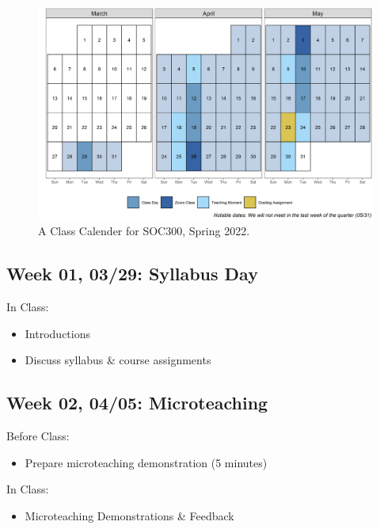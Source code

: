 \documentclass[11pt,]{article}
\providecommand{\tightlist}{%
  \setlength{\itemsep}{0pt}\setlength{\parskip}{0pt}}
\begin{document}
\begin{figure}[H]
  \includegraphics[width=0.95\columnwidth]{figs/calendar.png}
  \caption{A Class Calender for SOC300, Spring 2022.}
\end{figure}

\hypertarget{week-01-0329-syllabus-day}{%
\subsection{Week 01, 03/29: Syllabus
Day}\label{week-01-0329-syllabus-day}}

In Class:

\begin{itemize}
\tightlist
\item
  Introductions
\item
  Discuss syllabus \& course assignments
\end{itemize}

\hypertarget{week-02-0405-microteaching}{%
\subsection{Week 02, 04/05:
Microteaching}\label{week-02-0405-microteaching}}

Before Class:

\begin{itemize}
\tightlist
\item
  Prepare microteaching demonstration (5 minutes)
\end{itemize}

In Class:

\begin{itemize}
\tightlist
\item
  Microteaching Demonstrations \& Feedback
\end{itemize}
\end{document}
